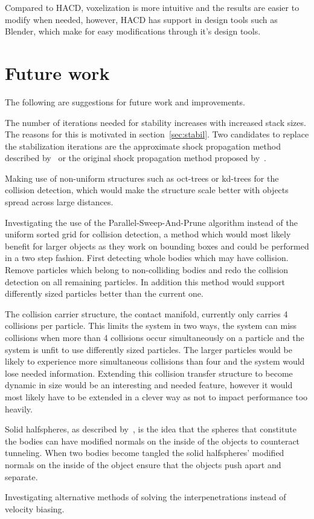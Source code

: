Compared to HACD, voxelization is more intuitive and the results are easier to modify
when needed, however, HACD has support in design tools such as Blender, which make
for easy modifications through it's design tools.

\section{Future work}
The following are suggestions for future work and improvements.

The number of iterations needed for stability increases with increased stack sizes.
The reasons for this is motivated in section~\ref{sec:stabil}.
Two candidates to replace the stabilization iterations are
the approximate shock propagation method described by~\cite{flex} or the original
shock propagation method proposed by~\cite{guendelman}.

Making use of non-uniform structures such as oct-trees or kd-trees for the collision
detection, which would make the structure scale better with objects spread across
large distances.

Investigating the use of the Parallel-Sweep-And-Prune algorithm instead of the
uniform sorted grid for collision detection, a method which would most likely
benefit for larger objects as they work on bounding boxes and could be performed
in a two step fashion. First detecting whole bodies which may have collision.
Remove particles which belong to non-colliding bodies and redo the collision detection
on all remaining particles. In addition this method would support differently sized
particles better than the current one.

The collision carrier structure, the contact manifold, currently only carries
4 collisions per particle. This limits the system in two ways, the system can miss
collisions when more than 4 collisions occur simultaneously on a particle and the
system is unfit to use differently sized particles. The larger particles would
be likely to experience more simultaneous collisions than four and the system would
lose needed information. Extending this collision transfer structure to become dynamic
in size would be an interesting and needed feature, however it would most likely have
to be extended in a clever way as not to impact performance too heavily.

Solid halfspheres, as described by~\cite{flex}, is the idea that the spheres that
constitute the bodies can have modified normals on the inside of the objects to counteract
tunneling. When two bodies become tangled the solid halfspheres' modified normals
on the inside of the object ensure that the objects push apart and separate.

Investigating alternative methods of solving the interpenetrations instead of velocity biasing.
